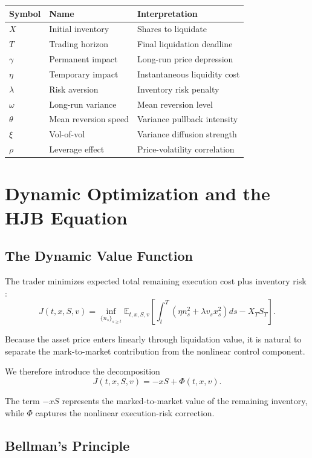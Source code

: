 \documentclass[11pt]{article}
\begin{document}
\begin{center}
\begin{tabular}{lll}
\toprule
Symbol & Name & Interpretation \\
\midrule
$X$ & Initial inventory & Shares to liquidate \\
$T$ & Trading horizon & Final liquidation deadline \\
$\gamma$ & Permanent impact & Long-run price depression \\
$\eta$ & Temporary impact & Instantaneous liquidity cost \\
$\lambda$ & Risk aversion & Inventory risk penalty \\
$\omega$ & Long-run variance & Mean reversion level \\
$\theta$ & Mean reversion speed & Variance pullback intensity \\
$\xi$ & Vol-of-vol & Variance diffusion strength \\
$\rho$ & Leverage effect & Price-volatility correlation \\
\bottomrule
\end{tabular}
\end{center}

\section{Dynamic Optimization and the HJB Equation}

\subsection{The Dynamic Value Function}

The trader minimizes expected total remaining execution cost plus inventory risk \cite{oksendal2003sde}:
\[
J(t,x,S,v)
=
\inf_{\{n_s\}_{s\ge t}}
\mathbb E_{t,x,S,v}
\left[
\int_t^T
\left(
\eta n_s^2
+
\lambda v_s x_s^2
\right)ds
-
X_TS_T
\right].
\]

Because the asset price enters linearly through liquidation value, it is natural to separate the mark-to-market contribution from the nonlinear control component.

We therefore introduce the decomposition
\[
J(t,x,S,v)
=
-xS + \Phi(t,x,v).
\]

The term $-xS$ represents the marked-to-market value of the remaining inventory, while $\Phi$ captures the nonlinear execution-risk correction.

\subsection{Bellman's Principle}
\end{document}
